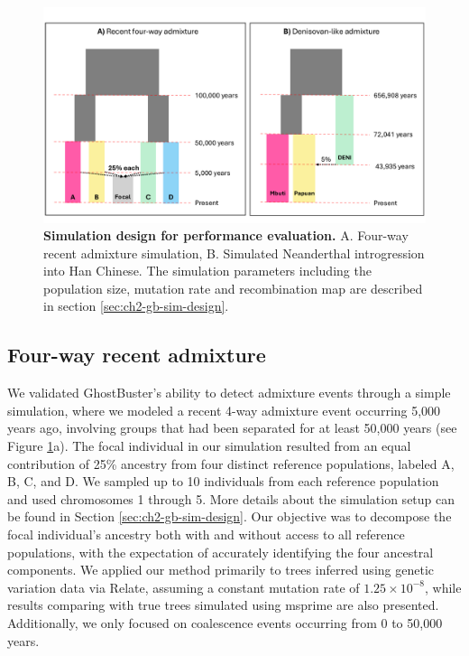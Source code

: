 \begin{figure}
    \centering
    \includegraphics[width=\textwidth]{figures/thesis_gb_sim_design.pdf}
    \caption{\textbf{Simulation design for performance evaluation.} A. Four-way recent admixture simulation, B. Simulated Neanderthal introgression into Han Chinese. The simulation parameters including the population size, mutation rate and recombination map are described in section \ref{sec:ch2-gb-sim-design}.}
    \label{fig:sim1}
\end{figure}

\subsection{Four-way recent admixture}


We validated GhostBuster's ability to detect admixture events through a simple simulation, where we modeled a recent 4-way admixture event occurring 5,000 years ago, involving groups that had been separated for at least 50,000 years (see Figure \ref{fig:sim1}a). The focal individual in our simulation resulted from an equal contribution of 25\% ancestry from four distinct reference populations, labeled A, B, C, and D. We sampled up to 10 individuals from each reference population and used chromosomes 1 through 5. More details about the simulation setup can be found in Section \ref{sec:ch2-gb-sim-design}. Our objective was to decompose the focal individual's ancestry both with and without access to all reference populations, with the expectation of accurately identifying the four ancestral components. We applied our method primarily to trees inferred using genetic variation data via Relate, assuming a constant mutation rate of $1.25 \times 10^{-8}$, while results comparing with true trees simulated using msprime are also presented. Additionally, we only focused on coalescence events occurring from 0 to 50,000 years.

